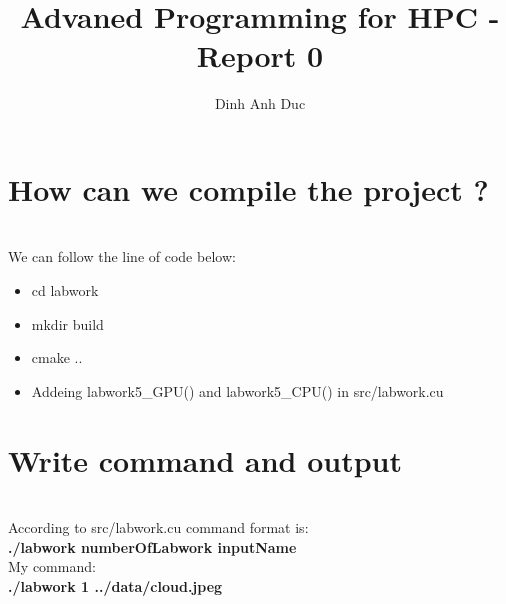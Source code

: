 \documentclass{article}
\title{Advaned Programming for HPC - Report 0}
\author{Dinh Anh Duc}
\begin{document}
\maketitle

\section*{How can we compile the project ?}
\\
We can follow the line of code below:
\begin{itemize}
\item cd labwork
\item mkdir build
\item cmake ..
\item Addeing labwork5\_GPU() and labwork5\_CPU() in src/labwork.cu
\end{itemize}

\section*{Write command and output}
\\
According to src/labwork.cu command format is:
\\
\textbf{./labwork \<numberOfLabwork\> \<inputName\>}
\\
My command: 
\\
\textbf{./labwork 1 ../data/cloud.jpeg}
\end{document}
